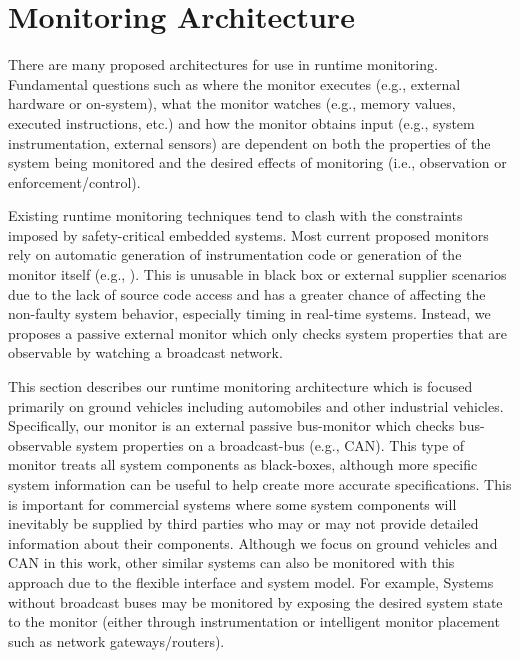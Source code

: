 
\section{Monitoring Architecture}
There are many proposed architectures for use in runtime monitoring. Fundamental questions such as where the monitor executes (e.g., external hardware or on-system), what the monitor watches (e.g., memory values, executed instructions, etc.) and how the monitor obtains input (e.g., system instrumentation, external sensors) are dependent on both the properties of the system being monitored and the desired effects of monitoring (i.e., observation or enforcement/control).  

Existing runtime monitoring techniques tend to clash with the constraints imposed by safety-critical embedded systems. 
Most current proposed monitors rely on automatic generation of instrumentation code or generation of the monitor itself (e.g., \cite{Havelund2002, Pike2011}).
This is unusable in black box or external supplier scenarios due to the lack of source code access and has a greater chance of affecting the non-faulty system behavior, especially timing in real-time systems.
Instead, we proposes a passive external monitor which only checks system properties that are observable by watching a broadcast network.

This section describes our runtime monitoring architecture which is focused primarily on ground vehicles including automobiles and other industrial vehicles. Specifically, our monitor is an external passive bus-monitor which checks bus-observable system properties on a broadcast-bus (e.g., CAN). 
This type of monitor treats all system components as black-boxes, although more specific system information can be useful to help create more accurate specifications. This is important for commercial systems where some system components will inevitably be supplied by third parties who may or may not provide detailed information about their components. 
Although we focus on ground vehicles and CAN in this work, other similar systems can also be monitored with this approach due to the flexible interface and system model.
For example, Systems without broadcast buses may be monitored by exposing the desired system state to the monitor (either through instrumentation or intelligent monitor placement such as network gateways/routers).

